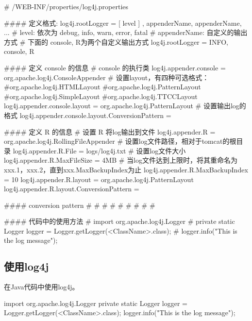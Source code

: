 \documentclass[a4paper,11pt]{article}
\begin{document}
\begin{bashcode}
# /WEB-INF/properties/log4j.properties

#### 定义格式: log4j.rootLogger = [ level ] , appenderName, appenderName, ...
# level: 依次为 debug, info, warn, error, fatal
# appenderName: 自定义的输出方式
# 下面的 console, R为两个自定义输出方式
log4j.rootLogger = INFO, console, R

#### 定义 console 的信息
# console 的执行类
log4j.appender.console = org.apache.log4j.ConsoleAppender
# 设置layout，有四种可选格式：
#org.apache.log4j.HTMLLayout
#org.apache.log4j.PatternLayout
#org.apache.log4j.SimpleLayout
#org.apache.log4j.TTCCLayout
log4j.appender.console.layout = org.apache.log4j.PatternLayout
# 设置输出log的格式
log4j.appender.console.layout.ConversionPattern =

#### 定义 R 的信息
# 设置 R 将log输出到文件
log4j.appender.R = org.apache.log4j.RollingFileAppender
# 设置log文件路径，相对于tomcat的根目录
log4j.appender.R.File = logs/log4j.txt
# 设置log文件大小
log4j.appender.R.MaxFileSize = 4MB
# 当log文件达到上限时，将其重命名为xxx.1，xxx.2，直到xxx.MaxBackupIndex为止
log4j.appender.R.MaxBackupIndex = 10
log4j.appender.R.layout = org.apache.log4j.PatternLayout
log4j.appender.R.layout.ConversionPattern =

#### conversion pattern
# %
# %
# %
# %
# %
# %
# %
# %
# %

#### 代码中的使用方法
# import org.apache.log4j.Logger
# private static Logger logger = Logger.getLogger(<ClassName>.class);
# logger.info("This is the log message");
\end{bashcode}

\subsection[使用log4j]{使用log4j}
在Java代码中使用log4j。

\begin{javacode}
import org.apache.log4j.Logger
private static Logger logger = Logger.getLogger(<ClassName>.class);
logger.info("This is the log message");
\end{javacode}
\end{document}
